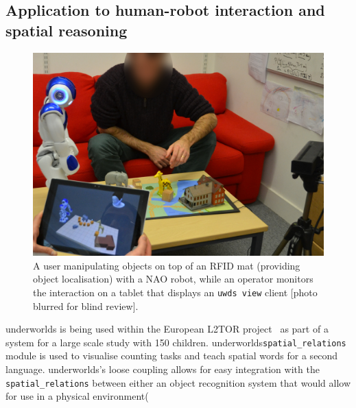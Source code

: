 \documentclass[letterpaper, 10pt, conference]{ieeeconf}
\newcommand{\uwds}{{\sc underworlds}\xspace}
\begin{document}
\subsection{Application to human-robot interaction and spatial reasoning}

\begin{figure}
    \centering
    \includegraphics[width=\linewidth]{l2tor-photo2-blind}
    \caption{A user manipulating objects on top of an RFID mat (providing object
    localisation) with a NAO robot, while an operator monitors
    the interaction on a tablet that displays an {\tt uwds view} client [photo blurred for blind review].}

    \label{fig|l2torexample}
\end{figure}

\uwds is being used within the European L2TOR project~\cite{belpaeme2015l2tor} as part of a system for a large scale study with 150 children. \uwds {\tt spatial\_relations} module is used to visualise counting tasks and teach spatial words for a second language. \uwds's loose coupling allows for easy integration with the {\tt spatial_relations} between either an object recognition system that would allow for use in a physical environment(


\end{document}
